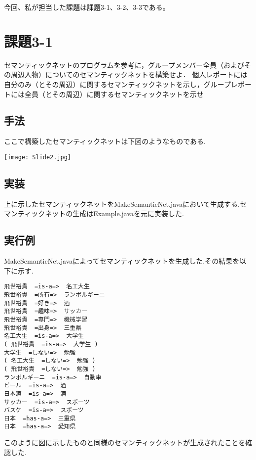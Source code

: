 \documentclass[a4j]{jarticle}
\begin{document}
今回、私が担当した課題は課題3-1、3-2、3-3である。

\section{課題3-1}
\begin{screen}
 セマンティックネットのプログラムを参考に，グループメンバー全員（およびその周辺人物）についてのセマンティックネットを構築せよ．
個人レポートには自分のみ（とその周辺）に関するセマンティックネットを示し，グループレポートには全員（とその周辺）に関するセマンティックネットを示せ
\end{screen}

\subsection{手法}
ここで構築したセマンティックネットは下図のようなものである.

\texttt{[image: Slide2.jpg]}

\subsection{実装}
上に示したセマンティックネットをMakeSemanticNet.javaにおいて生成する.セマンティックネットの生成はExample.javaを元に実装した.

\subsection{実行例}
MakeSemanticNet.javaによってセマンティックネットを生成した.その結果を以下に示す.

\begin{screen}
\begin{verbatim}
飛世裕貴  =is-a=>  名工大生
飛世裕貴  =所有=>  ランボルギーニ
飛世裕貴  =好き=>  酒
飛世裕貴  =趣味=>  サッカー
飛世裕貴  =専門=>  機械学習
飛世裕貴  =出身=>  三重県
名工大生  =is-a=>  大学生
( 飛世裕貴  =is-a=>  大学生 )
大学生  =しない=>  勉強
( 名工大生  =しない=>  勉強 )
( 飛世裕貴  =しない=>  勉強 )
ランボルギーニ  =is-a=>  自動車
ビール  =is-a=>  酒
日本酒  =is-a=>  酒
サッカー  =is-a=>  スポーツ
バスケ  =is-a=>  スポーツ
日本  =has-a=>  三重県
日本  =has-a=>  愛知県
\end{verbatim}
\end{screen}

このように図に示したものと同様のセマンティックネットが生成されたことを確認した.
\end{document}
